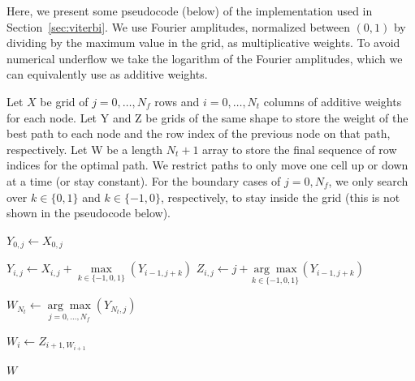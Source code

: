 \documentclass[paper-main.tex]{subfiles}
\begin{document}
Here, we present some pseudocode (below) of the implementation used in Section~\ref{sec:viterbi}. We use Fourier amplitudes, normalized between $(0, 1)$ by dividing by the maximum value in the grid, as multiplicative weights. 
To avoid numerical underflow we take the logarithm of the Fourier amplitudes, which we can equivalently use as additive weights.

Let $X$ be grid of $j=0,\ldots,N_f$ rows and $i=0,\ldots,N_t$ columns of additive weights for each node. Let Y and Z be grids of the same shape to store the weight of the best path to each node and the row index of the previous node on that path, respectively. Let W be a length $N_t+1$ array to store the final sequence of row indices for the optimal path. We restrict paths to only move one cell up or down at a time (or stay constant). For the boundary cases of $j=0,N_f$, we only search over $k \in \{0,1\}$ and $k \in \{-1,0\}$, respectively, to stay inside the grid (this is not shown in the pseudocode below).

\begin{algorithmic}

		\State $Y_{0,j} \gets X_{0,j}$
    \EndFor

		
	    	\State $Y_{i,j} \gets X_{i,j} + \underset{k \in \{-1,0,1\}}{\max} (Y_{i-1,j+k})$
	    	\State $Z_{i,j} \gets j + \underset{k \in \{-1,0,1\}}{\arg\max} (Y_{i-1,j+k})$
   
	    \EndFor
    \EndFor

    \State $W_{N_t} \gets \underset{j=0,\ldots,N_f}{\arg\max} (Y_{N_t,j})$


		\State $W_i \gets Z_{i+1, W_{i+1}}$

    \EndFor    

    \State \Return $W$
\EndFunction
\end{algorithmic}

\end{document}
